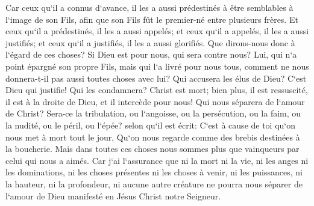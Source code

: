 \verse Car ceux qu`il a connus d`avance, il les a aussi prédestinés à être semblables à l`image de son Fils, afin que son Fils fût le premier-né entre plusieurs frères. 
\verse Et ceux qu`il a prédestinés, il les a aussi appelés; et ceux qu`il a appelés, il les a aussi justifiés; et ceux qu`il a justifiés, il les a aussi glorifiés. 
\verse Que dirons-nous donc à l`égard de ces choses? Si Dieu est pour nous, qui sera contre nous? 
\verse Lui, qui n`a point épargné son propre Fils, mais qui l`a livré pour nous tous, comment ne nous donnera-t-il pas aussi toutes choses avec lui? 
\verse Qui accusera les élus de Dieu? C`est Dieu qui justifie! 
\verse Qui les condamnera? Christ est mort; bien plus, il est ressuscité, il est à la droite de Dieu, et il intercède pour nous! 
\verse Qui nous séparera de l`amour de Christ? Sera-ce la tribulation, ou l`angoisse, ou la persécution, ou la faim, ou la nudité, ou le péril, ou l`épée? 
\verse selon qu`il est écrit: C`est à cause de toi qu`on nous met à mort tout le jour, Qu`on nous regarde comme des brebis destinées à la boucherie. 
\verse Mais dans toutes ces choses nous sommes plus que vainqueurs par celui qui nous a aimés. 
\verse Car j`ai l`assurance que ni la mort ni la vie, ni les anges ni les dominations, ni les choses présentes ni les choses à venir, 
\verse ni les puissances, ni la hauteur, ni la profondeur, ni aucune autre créature ne pourra nous séparer de l`amour de Dieu manifesté en Jésus Christ notre Seigneur. 

